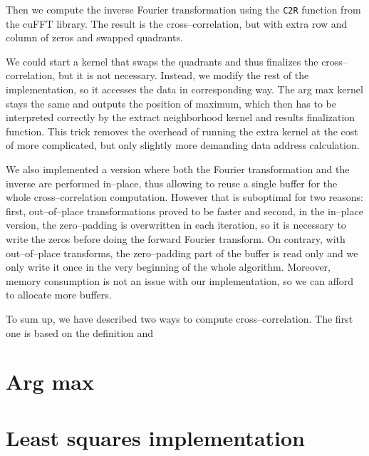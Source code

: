 Then we compute the inverse Fourier transformation using the \texttt{C2R} function from the cuFFT library. The result is the cross--correlation, but with extra row and column of zeros and swapped quadrants.

We could start a kernel that swaps the quadrants and thus finalizes the cross--correlation, but it is not necessary. Instead, we modify the rest of the implementation, so it accesses the data in corresponding way. The arg max kernel stays the same and outputs the position of maximum, which then has to be interpreted correctly by the extract neighborhood kernel and results finalization function. This trick removes the overhead of running the extra kernel at the cost of more complicated, but only slightly more demanding data address calculation.

We also implemented a version where both the Fourier transformation and the inverse are performed in--place, thus allowing to reuse a single buffer for the whole cross--correlation computation. However that is suboptimal for two reasons: first, out--of--place transformations proved to be faster and second, in the in--place version, the zero--padding is overwritten in each iteration, so it is necessary to write the zeros before doing the forward Fourier transform. On contrary, with out--of--place transforms, the zero--padding part of the buffer is read only and we only write it once in the very beginning of the whole algorithm. Moreover, memory consumption is not an issue with our implementation, so we can afford to allocate more buffers.

\vspace{5px}

To sum up, we have described two ways to compute cross--correlation. The first one is based on the definition and  


\section{Arg max}



\section{Least squares implementation}